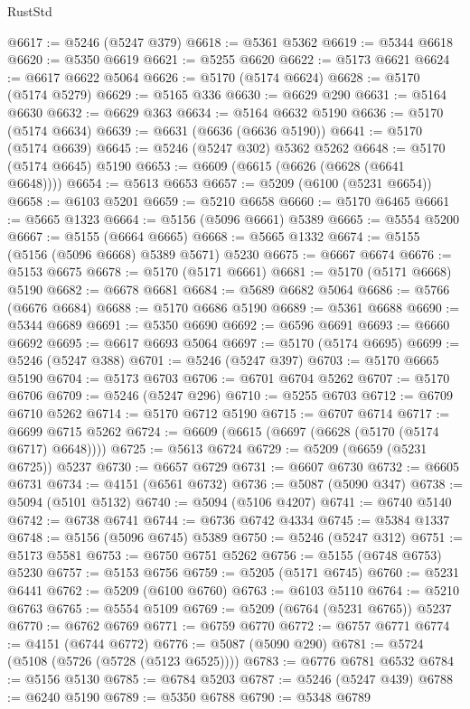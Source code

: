 \begin{lexlean}{RustStd}
\begin{coremodule}
@6617 := @5246 (@5247 @379)
@6618 := @5361 @5362
@6619 := @5344 @6618
@6620 := @5350 @6619
@6621 := @5255 @6620
@6622 := @5173 @6621
@6624 := @6617 @6622 @5064
@6626 := @5170 (@5174 @6624)
@6628 := @5170 (@5174 @5279)
@6629 := @5165 @336
@6630 := @6629 @290
@6631 := @5164 @6630
@6632 := @6629 @363
@6634 := @5164 @6632 @5190
@6636 := @5170 (@5174 @6634)
@6639 := @6631 (@6636 (@6636 @5190))
@6641 := @5170 (@5174 @6639)
@6645 := @5246 (@5247 @302) @5362 @5262
@6648 := @5170 (@5174 @6645) @5190
@6653 := @6609 (@6615 (@6626 (@6628 (@6641 @6648))))
@6654 := @5613 @6653
@6657 := @5209 (@6100 (@5231 @6654))
@6658 := @6103 @5201
@6659 := @5210 @6658
@6660 := @5170 @6465
@6661 := @5665 @1323
@6664 := @5156 (@5096 @6661) @5389
@6665 := @5554 @5200
@6667 := @5155 (@6664 @6665)
@6668 := @5665 @1332
@6674 := @5155 (@5156 (@5096 @6668) @5389 @5671) @5230
@6675 := @6667 @6674
@6676 := @5153 @6675
@6678 := @5170 (@5171 @6661)
@6681 := @5170 (@5171 @6668) @5190
@6682 := @6678 @6681
@6684 := @5689 @6682 @5064
@6686 := @5766 (@6676 @6684)
@6688 := @5170 @6686 @5190
@6689 := @5361 @6688
@6690 := @5344 @6689
@6691 := @5350 @6690
@6692 := @6596 @6691
@6693 := @6660 @6692
@6695 := @6617 @6693 @5064
@6697 := @5170 (@5174 @6695)
@6699 := @5246 (@5247 @388)
@6701 := @5246 (@5247 @397)
@6703 := @5170 @6665 @5190
@6704 := @5173 @6703
@6706 := @6701 @6704 @5262
@6707 := @5170 @6706
@6709 := @5246 (@5247 @296)
@6710 := @5255 @6703
@6712 := @6709 @6710 @5262
@6714 := @5170 @6712 @5190
@6715 := @6707 @6714
@6717 := @6699 @6715 @5262
@6724 := @6609 (@6615 (@6697 (@6628 (@5170 (@5174 @6717) @6648))))
@6725 := @5613 @6724
@6729 := @5209 (@6659 (@5231 @6725)) @5237
@6730 := @6657 @6729
@6731 := @6607 @6730
@6732 := @6605 @6731
@6734 := @4151 (@6561 @6732)
@6736 := @5087 (@5090 @347)
@6738 := @5094 (@5101 @5132)
@6740 := @5094 (@5106 @4207)
@6741 := @6740 @5140
@6742 := @6738 @6741
@6744 := @6736 @6742 @4334
@6745 := @5384 @1337
@6748 := @5156 (@5096 @6745) @5389
@6750 := @5246 (@5247 @312)
@6751 := @5173 @5581
@6753 := @6750 @6751 @5262
@6756 := @5155 (@6748 @6753) @5230
@6757 := @5153 @6756
@6759 := @5205 (@5171 @6745)
@6760 := @5231 @6441
@6762 := @5209 (@6100 @6760)
@6763 := @6103 @5110
@6764 := @5210 @6763
@6765 := @5554 @5109
@6769 := @5209 (@6764 (@5231 @6765)) @5237
@6770 := @6762 @6769
@6771 := @6759 @6770
@6772 := @6757 @6771
@6774 := @4151 (@6744 @6772)
@6776 := @5087 (@5090 @290)
@6781 := @5724 (@5108 (@5726 (@5728 (@5123 @6525))))
@6783 := @6776 @6781 @6532
@6784 := @5156 @5130
@6785 := @6784 @5203
@6787 := @5246 (@5247 @439)
@6788 := @6240 @5190
@6789 := @5350 @6788
@6790 := @5348 @6789

\end{coremodule}
\end{lexlean}
